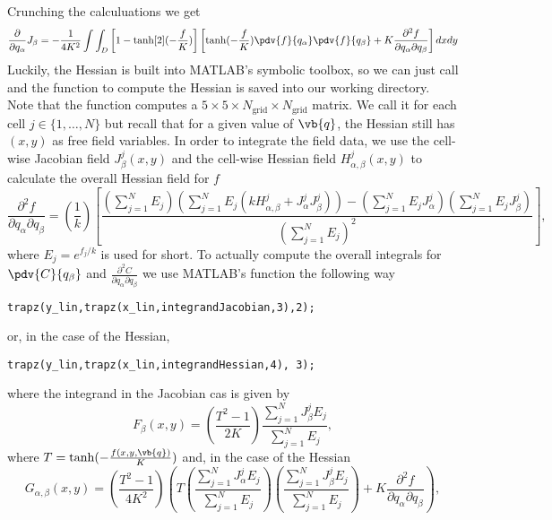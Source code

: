 Crunching the calculuations we get
\begin{equation}
 \frac{\partial }{\partial q_{\alpha}} J_{\beta} = -\frac{1}{4 K^2} \int \int_D \left[ 1- \tanh[2]( -\frac{f}{K}) \right] \left[\tanh(-\frac{f}{K})\pdv{f}{q_{\alpha}}\pdv{f}{q_{\beta}} + K \frac{\partial^2 f}{ \partial q_{\alpha} \partial q_{\beta}}\right]  dx dy
\end{equation}
Luckily, the Hessian is built into MATLAB's symbolic toolbox, so we can just call  and the function to compute
the Hessian is saved into our working directory. Note that the function  computes a $5 \times 5 \times N_{\textrm{grid}} \times N_{\textrm{grid}}$ matrix. 
We call it for each cell $j \in \{1, \ldots, N\}$ but recall that for a given value of $\vb{q}$, the Hessian still has $(x,y)$ as free field variables. In order to integrate
the field data, we use the cell-wise Jacobian field $J_{\beta}^j (x,y)$ and the cell-wise Hessian field $H_{\alpha, \beta}^j (x,y)$ to calculate the overall Hessian field for $f$
\begin{equation*}
    \frac{\partial^2 f}{ \partial q_{\alpha} \partial q_{\beta}} = \left(\frac{1}{k}\right) \left[ \frac{\left(\sum_{j=1}^N E_j\right) \left( \sum_{j=1}^N E_j (k H_{\alpha, \beta}^j + J_{\alpha}^j J_{\beta}^j)\right) - \left(\sum_{j=1}^N E_j J_\alpha^j \right) \left(\sum_{j=1}^N E_j J_\beta^j \right)}{\left(\sum_{j=1}^N E_j\right)^2} \right],
\end{equation*}
where $E_j = e^{f_j/k}$ is used for short. To actually compute the overall integrals for $\pdv{C}{q_{\beta}}$ and $\frac{\partial^2 C}{ \partial q_\alpha \partial q_\beta }$
we use MATLAB's  function the following way
\begin{lstlisting}[style=Matlab-editor]
    trapz(y_lin,trapz(x_lin,integrandJacobian,3),2);
\end{lstlisting}
or, in the case of the Hessian,
\begin{lstlisting}[style=Matlab-editor]
    trapz(y_lin,trapz(x_lin,integrandHessian,4), 3);
\end{lstlisting}
where the integrand in the Jacobian cas is given by
\begin{equation*}
    F_{\beta}(x,y) = \left(\frac{T^2-1}{2K} \right)\frac{ \sum_{j=1}^N J_\beta^j E_j}{ \sum_{j=1}^N E_j},
\end{equation*}
where $T = \tanh( -\frac{f(x,y,\vb{q})}{K})$ and, in the case of the Hessian
\begin{equation*}
    G_{\alpha, \beta}(x,y) = 
\left(\frac{T^2-1}{4K^2} \right) \left(T \left(\frac{ \sum_{j=1}^N J_\alpha^j E_j}{ \sum_{j=1}^N E_j}\right) \left(\frac{ \sum_{j=1}^N J_\beta^j E_j}{ \sum_{j=1}^N E_j}\right) + K \frac{\partial^2 f}{ \partial q_{\alpha} \partial q_{\beta}} \right),
\end{equation*}
